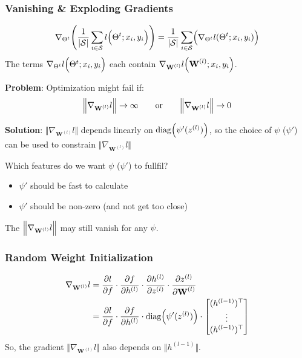 \newpage

\subsubsection{Vanishing \& Exploding Gradients}
$$
    \nabla_{\Theta^t} \Biggl( \frac{1}{|\mathcal{S}|}\sum_{i\in \mathcal{S}} l\Bigl( \Theta^t; x_i,y_i \Bigr) \Biggr) = \frac{1}{|\mathcal{S}|}\sum_{i \in \mathcal{S}}\Bigl( \nabla_{\Theta^t} l(\Theta^t;x_i,y_i) \Bigr)
$$
The terms $\nabla_{\Theta^t} l\Bigl(\Theta^t;x_i,y_i\Bigr)$ each contain $\nabla_{\textbf{W}^{(l)}}l\Bigl(\textbf{W}^{(l)};x_i,y_i\Bigr)$.

\textbf{Problem}: Optimization might fail if:
$$
    \Bigl\Vert \nabla_{\textbf{W}^{(l)}}l \Bigr\Vert \to \infty \qquad\text{or}\qquad  \Bigl\Vert \nabla_{\textbf{W}^{(l)}}l \Bigr\Vert \to 0
$$

\textbf{Solution}: $\Vert \nabla_{\textbf{W}^{(l)}}l \Vert$ depends linearly on $\text{diag}\Bigl( \psi'(z^{(l)}) \Bigr)$, so the choice of $\psi$ ($\psi'$) can be used to constrain $\Vert \nabla_{\textbf{W}^{(l)}}l \Vert$\\


Which features do we want $\psi$ ($\psi'$) to fullfil?
\begin{itemize}
    \item $\psi'$ should be fast to calculate
    \item $\psi'$ should be non-zero (and not get too close)
\end{itemize}

\remark The $\Bigl\Vert \nabla_{\textbf{W}^{(l)}}l \Bigr\Vert$ may still vanish for any $\psi$.

\subsubsection{Random Weight Initialization}
\begin{align*}
    \nabla_{\textbf{W}^{(l)}}l  &= \frac{\partial l}{\partial f}\cdot\frac{\partial f}{\partial h^{(l)}}\cdot\frac{\partial h^{(l)}}{\partial z^{(l)}}\cdot\frac{\partial z^{(l)}}{\partial \textbf{W}^{(l)}} \\
                                &= \frac{\partial l}{\partial f}\cdot\frac{\partial f}{\partial h^{(l)}}\cdot\text{diag}\Bigl( \psi'(z^{(l)}) \Bigr)\cdot\begin{bmatrix}
                                    (h^{(l-1)})^\top  \\
                                    \vdots          \\
                                    (h^{(l-1)})^\top
                                \end{bmatrix}
\end{align*}
So, the gradient $\Vert \nabla_{\textbf{W}^{(l)}}l \Vert$ also depends on $\Vert h^{(l-1)} \Vert$.\\



